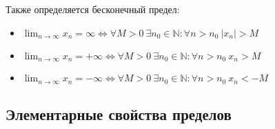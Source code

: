 Также определяется бесконечный предел:
\begin{itemize}
	\item $\displaystyle \lim_{n \to \infty} x_n = \infty \Leftrightarrow
	\forall M > 0 \ \exists n_0 \in \mathbb N \colon \forall n > n_0 \ |x_n| > M$
	\item $\displaystyle \lim_{n \to \infty} x_n = +\infty \Leftrightarrow
	\forall M > 0 \ \exists n_0 \in \mathbb N \colon \forall n > n_0 \ x_n > M$
	\item $\displaystyle \lim_{n \to \infty} x_n = -\infty \Leftrightarrow
	\forall M > 0 \ \exists n_0 \in \mathbb N \colon \forall n > n_0 \ x_n < -M$
\end{itemize}

\subsection{Элементарные свойства пределов}
